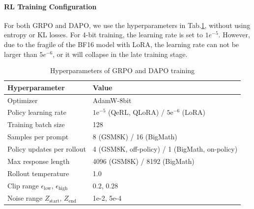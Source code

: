 \paragraph{RL Training Configuration} For both GRPO and DAPO, we use the hyperparameters in Tab.\ref{train_hyperparameters}, without using entropy or KL losses. For 4-bit training, the learning rate is set to $1e^{-5}$. However, due to the fragile of the BF16 model with LoRA, the learning rate can not be larger than $5e^{-6}$, or it will collapse in the late training stage.
\begin{table}[!htb]
\centering
\begin{tabular}{@{}ll@{}}
\toprule
\textbf{Hyperparameter} & \textbf{Value} \\
\midrule
Optimizer & AdamW-8bit \\
Policy learning rate & $1\text{e}^{-5}$ (QeRL, QLoRA) / $5\text{e}^{-6}$ (LoRA) \\
Training batch size & 128 \\
Samples per prompt & 8 (GSM8K) / 16 (BigMath) \\
Policy updates per rollout & 4 (GSM8K, off-policy) / 1 (BigMath, on-policy) \\
Max response length & 4096 (GSM8K) / 8192 (BigMath) \\
Rollout temperature & 1.0 \\
Clip range $\epsilon_{\text{low}}$, $\epsilon_{\text{high}}$ & $0.2$, $0.28$ \\
Noise range $Z_{\text{start}}$, $Z_{\text{end}}$ & 1e-2, 5e-4 \\
\bottomrule
\end{tabular}
\vspace{-5pt}
\caption{Hyperparameters of GRPO and DAPO training}\label{train_hyperparameters}
\end{table}

